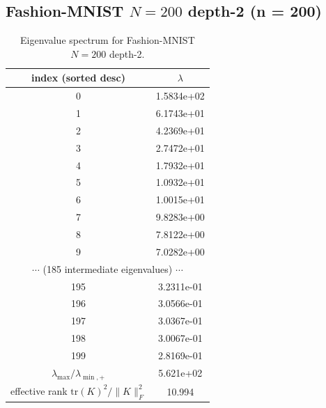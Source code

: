 \subsection*{Fashion-MNIST $N = 200$ depth-2 \quad (n = 200)}
\begin{table}[H]
\centering
\caption{Eigenvalue spectrum for Fashion-MNIST $N = 200$ depth-2.}
\begin{tabular}{c c}
\toprule
index (sorted desc) & $\lambda$ \\
\midrule
0 & 1.5834e+02 \\
1 & 6.1743e+01 \\
2 & 4.2369e+01 \\
3 & 2.7472e+01 \\
4 & 1.7932e+01 \\
5 & 1.0932e+01 \\
6 & 1.0015e+01 \\
7 & 9.8283e+00 \\
8 & 7.8122e+00 \\
9 & 7.0282e+00 \\
\multicolumn{2}{c}{$\cdots$ (185 intermediate eigenvalues) $\cdots$} \\
195 & 3.2311e-01 \\
196 & 3.0566e-01 \\
197 & 3.0367e-01 \\
198 & 3.0067e-01 \\
199 & 2.8169e-01 \\
\midrule
$\lambda_{\max}/\lambda_{\min, +}$ & 5.621e+02 \\
effective rank $\mathrm{tr}(K)^2/\|K\|_F^2$ & 10.994 \\
\bottomrule
\end{tabular}
\end{table}

